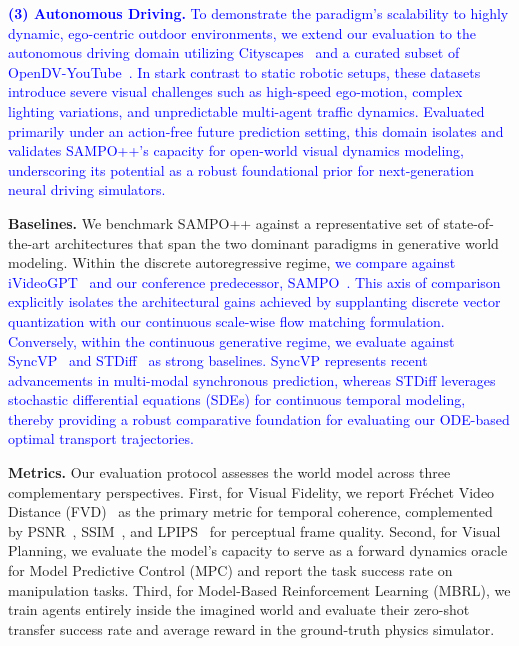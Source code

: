 \textcolor{blue}{\textbf{(3) Autonomous Driving.} To demonstrate the paradigm's scalability to highly dynamic, ego-centric outdoor environments, we extend our evaluation to the autonomous driving domain utilizing Cityscapes~\cite{Cityscapes} and a curated subset of OpenDV-YouTube~\cite{yang2024genad}. In stark contrast to static robotic setups, these datasets introduce severe visual challenges such as high-speed ego-motion, complex lighting variations, and unpredictable multi-agent traffic dynamics. Evaluated primarily under an action-free future prediction setting, this domain isolates and validates SAMPO++'s capacity for open-world visual dynamics modeling, underscoring its potential as a robust foundational prior for next-generation neural driving simulators.}

\textbf{Baselines.} We benchmark SAMPO++ against a representative set of state-of-the-art architectures that span the two dominant paradigms in generative world modeling. Within the discrete autoregressive regime, \textcolor{blue}{we compare against iVideoGPT~\cite{wu2024ivideogpt} and our conference predecessor, SAMPO~\cite{wang2025sampo}. This axis of comparison explicitly isolates the architectural gains achieved by supplanting discrete vector quantization with our continuous scale-wise flow matching formulation. Conversely, within the continuous generative regime, we evaluate against SyncVP~\cite{Pallotta_2025_CVPR} and STDiff~\cite{STDiff} as strong baselines. SyncVP represents recent advancements in multi-modal synchronous prediction, whereas STDiff leverages stochastic differential equations (SDEs) for continuous temporal modeling, thereby providing a robust comparative foundation for evaluating our ODE-based optimal transport trajectories.}

\textbf{Metrics.} Our evaluation protocol assesses the world model across three complementary perspectives. First, for Visual Fidelity, we report Fréchet Video Distance (FVD)~\cite{FVDunterthiner2018towards} as the primary metric for temporal coherence, complemented by PSNR~\cite{PSNRhuynh2008scope}, SSIM~\cite{SSIMwang2004image}, and LPIPS~\cite{LPIPSzhang2018unreasonable} for perceptual frame quality. Second, for Visual Planning, we evaluate the model's capacity to serve as a forward dynamics oracle for Model Predictive Control (MPC) and report the task success rate on manipulation tasks. Third, for Model-Based Reinforcement Learning (MBRL), we train agents entirely inside the imagined world and evaluate their zero-shot transfer success rate and average reward in the ground-truth physics simulator.


